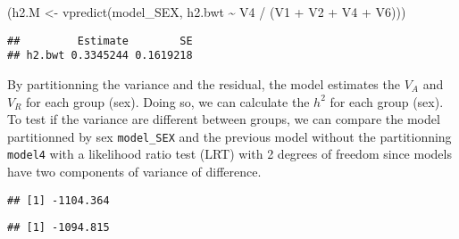 \documentclass[
  12pt,
]{book}
\newenvironment{Shaded}{\begin{snugshade}}{\end{snugshade}}
\newcommand{\DecValTok}[1]{\textcolor[rgb]{0.00,0.00,0.81}{#1}}
\newcommand{\FunctionTok}[1]{\textcolor[rgb]{0.00,0.00,0.00}{#1}}
\newcommand{\NormalTok}[1]{#1}
\newcommand{\OtherTok}[1]{\textcolor[rgb]{0.56,0.35,0.01}{#1}}
\newcommand{\SpecialCharTok}[1]{\textcolor[rgb]{0.00,0.00,0.00}{#1}}
\begin{document}
\begin{Shaded}
\begin{Highlighting}[]
\NormalTok{(h2.M }\OtherTok{\textless{}{-}} \FunctionTok{vpredict}\NormalTok{(model\_SEX, h2.bwt }\SpecialCharTok{\textasciitilde{}}\NormalTok{ V4 }\SpecialCharTok{/}\NormalTok{ (V1 }\SpecialCharTok{+}\NormalTok{ V2 }\SpecialCharTok{+}\NormalTok{ V4 }\SpecialCharTok{+}\NormalTok{ V6)))}
\end{Highlighting}
\end{Shaded}

\begin{verbatim}
##         Estimate        SE
## h2.bwt 0.3345244 0.1619218
\end{verbatim}

By partitionning the variance and the residual, the model estimates the \(V_A\) and \(V_R\) for each group (sex). Doing so, we can calculate the \(h^2\) for each group (sex).
To test if the variance are different between groups, we can compare the model partitionned by sex \texttt{model\_SEX} and the previous model without the partitionning \texttt{model4} with a likelihood ratio test (LRT) with 2 degrees of freedom since models have two components of variance of difference.

\begin{Shaded}
\end{Shaded}

\begin{verbatim}
## [1] -1104.364
\end{verbatim}

\begin{Shaded}
\end{Shaded}

\begin{verbatim}
## [1] -1094.815
\end{verbatim}

\begin{Shaded}
\end{Shaded}
\end{document}
